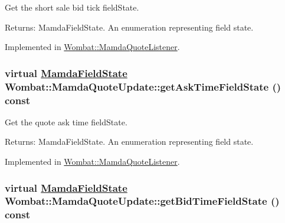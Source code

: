 Get the short sale bid tick field\-State. 

\begin{Desc}
\item[Returns:]Mamda\-Field\-State. An enumeration representing field state. \end{Desc}


Implemented in \hyperlink{classWombat_1_1MamdaQuoteListener_35f256d26e13d0dc0302c256567f54ba}{Wombat::Mamda\-Quote\-Listener}.\hypertarget{classWombat_1_1MamdaQuoteUpdate_64e89c53f087044bfe5352e6d45c891d}{
\subsubsection[getAskTimeFieldState]{\setlength{\rightskip}{0pt plus 5cm}virtual \hyperlink{namespaceWombat_93aac974f2ab713554fd12a1fa3b7d2a}{Mamda\-Field\-State} Wombat::Mamda\-Quote\-Update::get\-Ask\-Time\-Field\-State () const}}
\label{classWombat_1_1MamdaQuoteUpdate_64e89c53f087044bfe5352e6d45c891d}


Get the quote ask time field\-State. 

\begin{Desc}
\item[Returns:]Mamda\-Field\-State. An enumeration representing field state. \end{Desc}


Implemented in \hyperlink{classWombat_1_1MamdaQuoteListener_355651d7e3a9641c607fa3e82ce8e833}{Wombat::Mamda\-Quote\-Listener}.\hypertarget{classWombat_1_1MamdaQuoteUpdate_c375bfc99202bfe4f2fe5a9100a8bebc}{
\subsubsection[getBidTimeFieldState]{\setlength{\rightskip}{0pt plus 5cm}virtual \hyperlink{namespaceWombat_93aac974f2ab713554fd12a1fa3b7d2a}{Mamda\-Field\-State} Wombat::Mamda\-Quote\-Update::get\-Bid\-Time\-Field\-State () const}}
\label{classWombat_1_1MamdaQuoteUpdate_c375bfc99202bfe4f2fe5a9100a8bebc}


